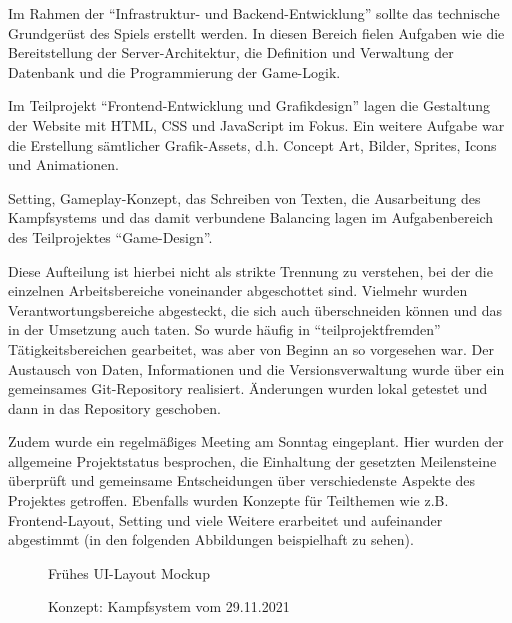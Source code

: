 Im Rahmen der \enquote{Infrastruktur- und Backend-Entwicklung} sollte das technische Grundgerüst des Spiels erstellt werden. In diesen Bereich fielen Aufgaben wie die Bereitstellung der Server-Architektur, die Definition und Verwaltung der Datenbank und die Programmierung der Game-Logik.

Im Teilprojekt \enquote{Frontend-Entwicklung und Grafikdesign} lagen die Gestaltung der Website mit HTML, CSS und JavaScript im Fokus. Ein weitere Aufgabe war die Erstellung sämtlicher Grafik-Assets, d.h. Concept Art, Bilder, Sprites, Icons und Animationen.

Setting, Gameplay-Konzept, das Schreiben von Texten, die Ausarbeitung des Kampfsystems und das damit verbundene Balancing lagen im Aufgabenbereich des Teilprojektes \enquote{Game-Design}.

Diese Aufteilung ist hierbei nicht als strikte Trennung zu verstehen, bei der die einzelnen Arbeitsbereiche voneinander abgeschottet sind. Vielmehr wurden Verantwortungsbereiche abgesteckt, die sich auch überschneiden können und das in der Umsetzung auch taten. So wurde häufig in \enquote{teilprojektfremden} Tätigkeitsbereichen gearbeitet, was aber von Beginn an so vorgesehen war. Der Austausch von Daten, Informationen und die Versionsverwaltung wurde über ein gemeinsames Git-Repository realisiert. Änderungen wurden lokal getestet und dann in das Repository geschoben. 

Zudem wurde ein regelmäßiges Meeting am Sonntag eingeplant. Hier wurden der allgemeine Projektstatus besprochen, die Einhaltung der gesetzten Meilensteine überprüft und gemeinsame Entscheidungen über verschiedenste Aspekte des Projektes getroffen.
Ebenfalls wurden Konzepte für Teilthemen wie z.B. Frontend-Layout, Setting und viele Weitere erarbeitet und aufeinander abgestimmt (in den folgenden Abbildungen beispielhaft zu sehen).

\begin{figure}[H]
    \centering
    \caption{Frühes UI-Layout Mockup}
    \label{fig:2021-12-05-Projketbesprechung-Miro-d}
\end{figure}


\begin{figure}[H]
    \centering
    \caption{Konzept: Kampfsystem vom 29.11.2021}
    \label{fig:2021-11-29-konzept_kampfsystem}
\end{figure}





